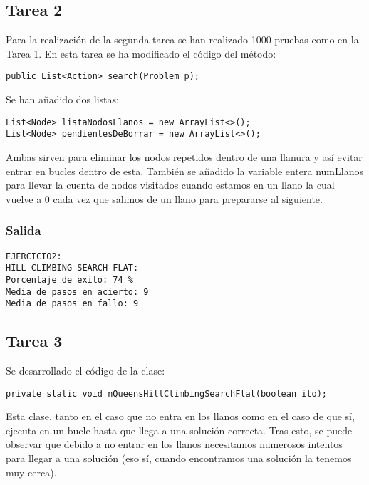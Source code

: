 \documentclass[a4paper]{article}
\begin{document}
\subsection{Tarea 2}
Para la realización de la segunda tarea se han realizado 1000 pruebas como en la Tarea 1. En esta tarea se ha modificado el código del método:
\begin{lstlisting}[style=Java]
public List<Action> search(Problem p);
\end{lstlisting}
Se han añadido dos listas:
\begin{lstlisting}[style=Java]
List<Node> listaNodosLlanos = new ArrayList<>();
List<Node> pendientesDeBorrar = new ArrayList<>();
\end{lstlisting}
Ambas sirven para eliminar los nodos repetidos dentro de una llanura y así evitar entrar en bucles dentro de esta.
También se añadido la variable entera numLlanos para llevar la cuenta de nodos visitados cuando estamos en un llano la cual vuelve a 0 cada vez que salimos de un llano para prepararse al siguiente.
\subsubsection{Salida}
\begin{lstlisting}[style=consola, numbers=none]
EJERCICIO2:
HILL CLIMBING SEARCH FLAT:
Porcentaje de exito: 74 %
Media de pasos en acierto: 9
Media de pasos en fallo: 9
\end{lstlisting}

\subsection{Tarea 3}
Se desarrollado el código de la clase:
\begin{lstlisting}[style=Java]
private static void nQueensHillClimbingSearchFlat(boolean ito);
\end{lstlisting}
Esta clase, tanto en el caso que no entra en los llanos como en el caso de que sí, ejecuta en un bucle hasta que llega a una solución correcta. Tras esto, se puede observar que debido a no entrar en los llanos necesitamos numerosos intentos para llegar a una solución (eso sí, cuando encontramos una solución la tenemos muy cerca).
\end{document}
